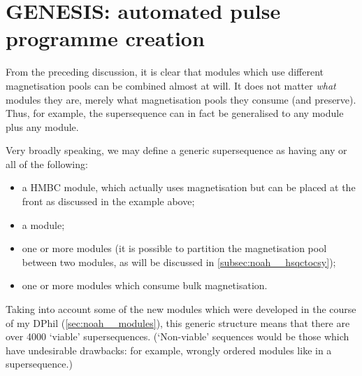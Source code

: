\section{GENESIS: automated pulse programme creation}
\label{sec:noah__genesis}

From the preceding discussion, it is clear that modules which use different magnetisation pools can be combined almost at will.
It does not matter \textit{what} modules they are, merely what magnetisation pools they consume (and preserve).
Thus, for example, the  supersequence can in fact be generalised to any  module plus any  module.

Very broadly speaking, we may define a generic supersequence as having any or all of the following:

\begin{itemize}
    \item a HMBC module, which actually uses  magnetisation but can be placed at the front as discussed in the  example above;
    \item a  module;
    \item one or more  modules (it is possible to partition the  magnetisation pool between two modules, as will be discussed in \cref{subsec:noah__hsqctocsy});
    \item one or more  modules which consume bulk magnetisation.
\end{itemize}

Taking into account some of the new modules which were developed in the course of my DPhil (\cref{sec:noah__modules}), this generic structure means that there are over 4000 `viable' supersequences.
(`Non-viable' sequences would be those which have undesirable drawbacks: for example, wrongly ordered modules like in a  supersequence.)

